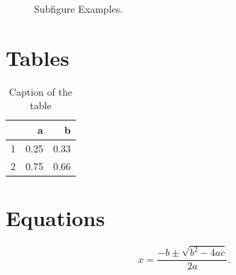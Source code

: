 \begin{figure}[ht]
\centering 
{}
\caption{Subfigure Examples.}
\label{fig:examples}
\end{figure}




\section{Tables}
\begin{table}[ht]
\centering
\begin{tabular}{m{1cm}|rr}
& a & b\\ 
\hline
1& 0.25 & 0.33\\
2& 0.75 & 0.66\\
\end{tabular}
\caption{Caption of the table}\label{table:example}
\end{table}


\section{Equations}

\begin{equation}
x = \frac{-b \pm \sqrt{b^2-4ac}}{2a}. \label{eq:example}
\end{equation}

